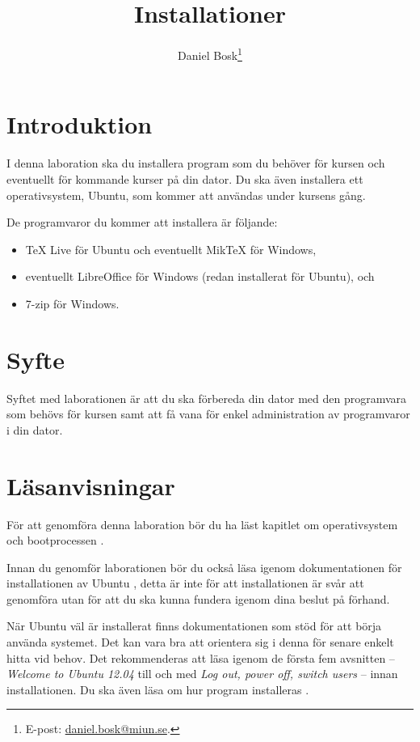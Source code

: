 \documentclass[11pt,a4paper]{miunasgn}
\title{Installationer}
\author{Daniel Bosk\footnote{%
	E-post: \href{mailto:daniel.bosk@miun.se}{daniel.bosk@miun.se}.
}}
\date{\svnId}
\begin{document}
\maketitle
\thispagestyle{foot}
\tableofcontents


\section{Introduktion}
\label{sec:Introduktion}
\noindent
I denna laboration ska du installera program som du behöver för kursen och 
eventuellt för kommande kurser på din dator.
Du ska även installera ett operativsystem, Ubuntu, som kommer att användas 
under kursens gång.

De programvaror du kommer att installera är följande:
\begin{itemize}
	\item TeX Live för Ubuntu och eventuellt MikTeX för Windows,
	\item eventuellt LibreOffice för Windows (redan installerat för Ubuntu), och
	\item 7-zip för Windows.
\end{itemize}


\section{Syfte}
\label{sec:Syfte}
\noindent
Syftet med laborationen är att du ska förbereda din dator med den programvara 
som behövs för kursen samt att få vana för enkel administration av programvaror 
i din dator.


\section{Läsanvisningar}
\label{sec:Lasanvisningar}
\noindent
För att genomföra denna laboration bör du ha läst kapitlet om operativsystem 
och bootprocessen \citep[kapitel 3]{Brookshear2012csa}.

Innan du genomför laborationen bör du också läsa igenom dokumentationen för 
installationen av Ubuntu \citep{UbuntuInstall}, detta är inte för att 
installationen är svår att genomföra utan för att du ska kunna fundera igenom 
dina beslut på förhand.

När Ubuntu väl är installerat finns dokumentationen \citep{UbuntuDesktop} som 
stöd för att börja använda systemet.
Det kan vara bra att orientera sig i denna för senare enkelt hitta vid behov.
Det rekommenderas att läsa igenom de första fem avsnitten -- \emph{Welcome to 
Ubuntu 12.04} till och med \emph{Log out, power off, switch users} -- innan 
installationen.
Du ska även läsa om hur program installeras \citep[se Install additional 
software]{UbuntuDesktop}.
\end{document}
